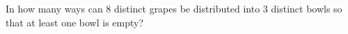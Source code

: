 In how many ways can $8$ distinct grapes be distributed into $3$ distinct bowls so that at least one bowl is empty?
